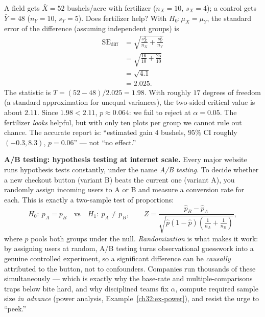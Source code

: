 \begin{example}
\label{ch32:ex-twosample}
A field gets $\bar X = 52$ bushels/acre with fertilizer ($n_X=10$, $s_X=4$); a control
gets $\bar Y = 48$ ($n_Y=10$, $s_Y=5$). Does fertilizer help? With $H_0\!:\mu_X=\mu_Y$,
the standard error of the difference (assuming independent groups) is
\begin{align*}
  \mathrm{SE}_{\text{diff}} &= \sqrt{\frac{s_X^2}{n_X}+\frac{s_Y^2}{n_Y}} \\
  &= \sqrt{\frac{16}{10}+\frac{25}{10}} \\
  &= \sqrt{4.1} \\
  &= 2.025.
\end{align*}
The statistic is $T = (52-48)/2.025 = 1.98$. With roughly $17$ degrees of freedom (a
standard approximation for unequal variances), the two-sided critical value is about
$2.11$. Since $1.98 < 2.11$, $p \approx 0.064$: we fail to reject at
$\alpha=0.05$. The fertilizer \emph{looks} helpful, but with only ten plots per group we
cannot rule out chance. The accurate report is: ``estimated gain $4$ bushels, $95\%$ CI
roughly $(-0.3, 8.3)$, $p=0.06$'' --- not ``no effect.''
\end{example}

\begin{applicationbox}
\textbf{A/B testing: hypothesis testing at internet scale.} Every major website runs
hypothesis tests constantly, under the name \emph{A/B testing}. To decide whether a new
checkout button (variant B) beats the current one (variant A), you randomly assign
incoming users to A or B and measure a conversion rate for each. This is exactly a
two-sample test of proportions:
\[
  H_0\!:\ p_A = p_B \quad\text{vs}\quad H_1\!:\ p_A \ne p_B,\qquad
  Z = \frac{\hat p_B - \hat p_A}{\sqrt{\hat p(1-\hat p)\left(\tfrac{1}{n_A}+\tfrac{1}{n_B}\right)}},
\]
where $\hat p$ pools both groups under the null. \emph{Randomization} is what makes it
work: by assigning users at random, A/B testing turns observational guesswork into
a genuine controlled experiment, so a significant difference can be \emph{causally}
attributed to the button, not to confounders. Companies run thousands of these
simultaneously --- which is exactly why the base-rate and multiple-comparisons traps
below bite hard, and why disciplined teams fix $\alpha$, compute required sample size
\emph{in advance} (power analysis, Example~\ref{ch32:ex-power}), and resist the urge to
``peek.''
\end{applicationbox}

